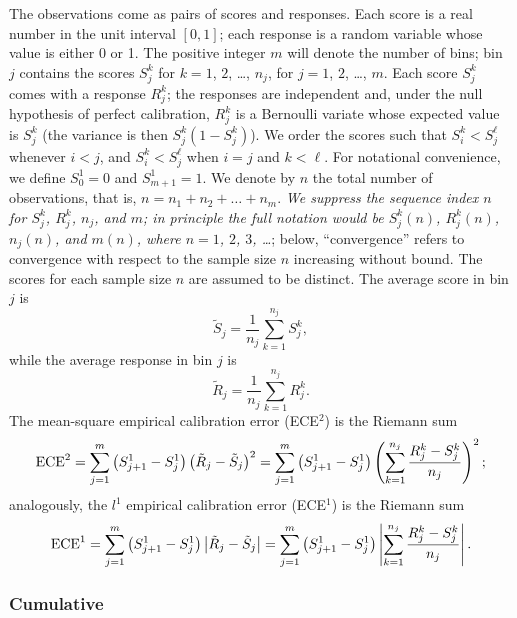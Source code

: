 \documentclass{article}
\begin{document}
The observations come as pairs of scores and responses.
Each score is a real number in the unit interval $[0, 1]$;
each response is a random variable whose value is either 0 or 1.
The positive integer $m$ will denote the number of bins;
bin $j$ contains the scores $S_j^k$ for $k = 1$, $2$, \dots, $n_j$,
for $j = 1$, $2$, \dots, $m$.
Each score $S_j^k$ comes with a response $R_j^k$;
the responses are independent and, under the null hypothesis
of perfect calibration, $R_j^k$ is a Bernoulli variate whose expected value
is $S_j^k$ (the variance is then $S_j^k \left( 1 - S_j^k \right)$).
We order the scores such that $S_i^k < S_j^\ell$ whenever $i < j$,
and $S_i^k < S_j^\ell$ when $i = j$ and $k < \ell$.
For notational convenience,
we define $S_0^1 = 0$ and $S_{m+1}^1 = 1$.
We denote by $n$ the total number of observations, that is,
$n = n_1 + n_2 + \dots + n_m$.
{\it We suppress the sequence index $n$ for $S_j^k$, $R_j^k$, $n_j$, and $m$;
in principle the full notation would be $S_j^k(n)$, $R_j^k(n)$, $n_j(n)$,
and $m(n)$, where $n = 1$, $2$, $3$, \dots};
below, ``convergence'' refers to convergence with respect
to the sample size $n$ increasing without bound.
The scores for each sample size $n$ are assumed to be distinct.
The average score in bin $j$ is
%
\begin{equation}
\label{avgscore}
\tilde{S}_j = \frac{1}{n_j} \sum_{k=1}^{n_j} S_j^k,
\end{equation}
%
while the average response in bin $j$ is
%
\begin{equation}
\label{avgresponse}
\tilde{R}_j = \frac{1}{n_j} \sum_{k=1}^{n_j} R_j^k.
\end{equation}
%
The mean-square empirical calibration error (ECE$^2$) is the Riemann sum
%
\begin{equation}
\label{l2}
\hbox{ECE}^2 = \sum_{j=1}^m \left( S_{j+1}^1 - S_j^1 \right)
\left( \tilde{R}_j - \tilde{S}_j \right)^2
= \sum_{j=1}^m \left(S_{j+1}^1 - S_j^1 \right)
\left( \sum_{k=1}^{n_j} \frac{R_j^k - S_j^k}{n_j} \right)^2;
\end{equation}
%
analogously, the $l^1$ empirical calibration error (ECE$^1$) is the Riemann sum
%
\begin{equation}
\label{l1}
\hbox{ECE}^1 = \sum_{j=1}^m \left( S_{j+1}^1 - S_j^1 \right)
\left| \tilde{R}_j - \tilde{S}_j \right|
= \sum_{j=1}^m \left(S_{j+1}^1 - S_j^1 \right)
\left| \sum_{k=1}^{n_j} \frac{R_j^k - S_j^k}{n_j} \right|.
\end{equation}

\subsubsection{Cumulative}
\label{cumsub}
\end{document}
